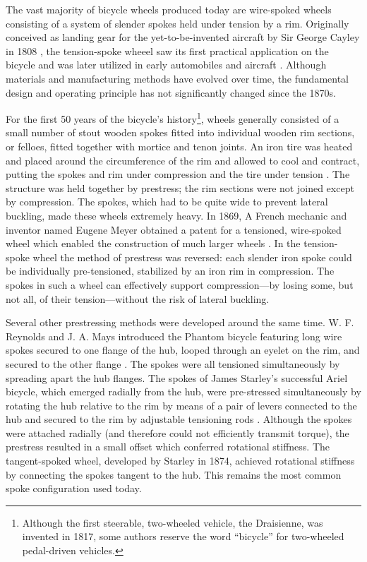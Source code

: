 \documentclass[../thesis.tex]{subfiles}
\begin{document}
The vast majority of bicycle wheels produced today are wire-spoked wheels consisting of a system of slender spokes held under tension by a rim. Originally conceived as landing gear for the yet-to-be-invented aircraft by Sir George Cayley in 1808 \cite{Ackroyd2011}, the tension-spoke wheeel saw its first practical application on the bicycle and was later utilized in early automobiles and aircraft \cite{Hadland2014}. Although materials and manufacturing methods have evolved over time, the fundamental design and operating principle has not significantly changed since the 1870s.

For the first 50 years of the bicycle's history\footnote{Although the first steerable, two-wheeled vehicle, the Draisienne, was invented in 1817, some authors reserve the word ``bicycle'' for two-wheeled pedal-driven vehicles.}, wheels generally consisted of a small number of stout wooden spokes fitted into individual wooden rim sections, or felloes, fitted together with mortice and tenon joints. An iron tire was heated and placed around the circumference of the rim and allowed to cool and contract, putting the spokes and rim under compression and the tire under tension \cite{Sharp1977}. The structure was held together by prestress; the rim sections were not joined except by compression. The spokes, which had to be quite wide to prevent lateral buckling, made these wheels extremely heavy. In 1869, A French mechanic and inventor named Eugene Meyer obtained a patent for a tensioned, wire-spoked wheel which enabled the construction of much larger wheels \cite{Clayton1991}. In the tension-spoke wheel the method of prestress was reversed: each slender iron spoke could be individually pre-tensioned, stabilized by an iron rim in compression. The spokes in such a wheel can effectively support compression---by losing some, but not all, of their tension---without the risk of lateral buckling.

Several other prestressing methods were developed around the same time. W. F. Reynolds and J. A. Mays introduced the Phantom bicycle featuring long wire spokes secured to one flange of the hub, looped through an eyelet on the rim, and secured to the other flange \cite{Herlihy2004}. The spokes were all tensioned simultaneously by spreading apart the hub flanges. The spokes of James Starley's successful Ariel bicycle, which emerged radially from the hub, were pre-stressed simultaneously by rotating the hub relative to the rim by means of a pair of levers connected to the hub and secured to the rim by adjustable tensioning rods \cite{Caunter1955}. Although the spokes were attached radially (and therefore could not efficiently transmit torque), the prestress resulted in a small offset which conferred rotational stiffness. The tangent-spoked wheel, developed by Starley in 1874, achieved rotational stiffness by connecting the spokes tangent to the hub. This remains the most common spoke configuration used today.
\end{document}
